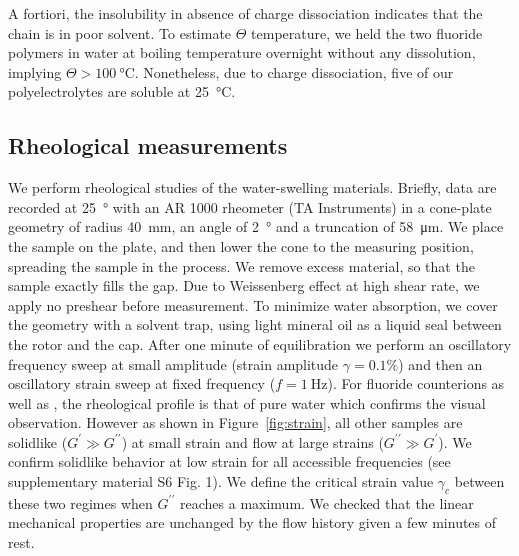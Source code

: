\documentclass[journal=jacsat,manuscript=article]{achemso}
\begin{document}
A fortiori, the insolubility in absence of charge dissociation indicates that the chain is in poor solvent. To estimate $\Theta$ temperature, we held the two fluoride polymers in water at boiling temperature overnight without any dissolution, implying $\Theta>\SI{100}{\celsius}$. Nonetheless, due to charge dissociation, five of our polyelectrolytes are soluble at \SI{25}{\celsius}.



\subsection{Rheological measurements}
We perform rheological studies of the water-swelling materials. Briefly, data are recorded at \SI{25}{\degree} with an AR 1000 rheometer (TA Instruments) in a cone-plate geometry of radius \SI{40}{\milli\metre}, an angle of \SI{2}{\degree} and a truncation of \SI{58}{\micro\metre}\cite{Macosko1994,Larson1999}. We place the sample on the plate, and then lower the cone to the measuring position, spreading the sample in the process. We remove excess material, so that the sample exactly fills the gap. Due to Weissenberg effect at high shear rate, we apply no preshear before measurement. To minimize water absorption, we cover the geometry with a solvent trap, using light mineral oil as a liquid seal between the rotor and the cap. After one minute of equilibration we perform an oscillatory frequency sweep at small amplitude (strain amplitude $\gamma=0.1\%$) and then an oscillatory strain sweep at fixed frequency ($f=\SI{1}{\hertz}$). For fluoride counterions as well as , the rheological profile is that of pure water which confirms the visual observation. However as shown in Figure~\ref{fig:strain}, all other samples are solidlike ($G^\prime \gg G^{\prime\prime}$) at small strain and flow at large strains ($G^{\prime\prime} \gg G^\prime$). We confirm solidlike behavior at low strain for all accessible frequencies (see supplementary material S6 Fig. 1). We define the critical strain value $\gamma_c$ between these two regimes when $G^{\prime\prime}$ reaches a maximum. We checked that the linear mechanical properties are unchanged by the flow history given a few minutes of rest. %
\end{document}
